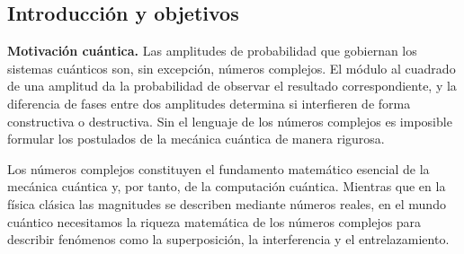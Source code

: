 \portada

\begin{esquemaExplorador}
\end{esquemaExplorador}


\subsection{Introducción y objetivos}

\begin{info}
  \textbf{Motivación cuántica.}
  Las amplitudes de probabilidad que gobiernan los sistemas cuánticos son, sin excepción, números complejos. El módulo al cuadrado de una amplitud da la probabilidad de observar el resultado correspondiente, y la diferencia de fases entre dos amplitudes determina si interfieren de forma constructiva o destructiva. Sin el lenguaje de los números complejos es imposible formular los postulados de la mecánica cuántica de manera rigurosa.
\end{info}

Los números complejos constituyen el fundamento matemático esencial de la mecánica cuántica y, por tanto, de la computación cuántica. Mientras que en la física clásica las magnitudes se describen mediante números reales, en el mundo cuántico necesitamos la riqueza matemática de los números complejos para describir fenómenos como la superposición, la interferencia y el entrelazamiento.

